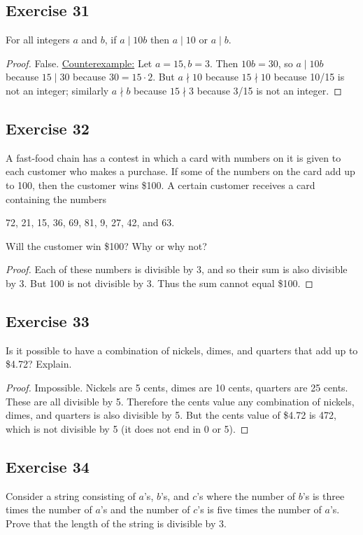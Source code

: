 \documentclass[14pt]{extarticle}
\begin{document}
\subsection{Exercise 31}
For all integers $a$ and $b$, if $a\mid 10b$ then $a\mid 10$ or $a\mid b$.

\begin{proof}
False. \underline{Counterexample:} Let $a = 15, b = 3$. Then $10b = 30$, so $a \mid 10b$ because $15 \mid 30$ because $30 = 15 \cdot 2$. But $a \nmid 10$ because $15 \nmid 10$ because 10/15 is not an integer; similarly $a \nmid b$ because $15 \nmid 3$ because 3/15 is not an integer.
\end{proof}

\subsection{Exercise 32}
A fast-food chain has a contest in which a card with numbers on it is given to each customer who makes a purchase. If some of the numbers on the card add up to 100, then the customer wins \$100. A certain customer receives a card containing the numbers 
\begin{center}
72, 21, 15, 36, 69, 81, 9, 27, 42, and 63. 
\end{center}
Will the customer win \$100? Why or why not?

\begin{proof}
Each of these numbers is divisible by 3, and so their sum is also divisible by 3. But 100 is not divisible by 3. Thus the sum cannot equal \$100.
\end{proof}

\subsection{Exercise 33}
Is it possible to have a combination of nickels, dimes, and quarters that add up to \$4.72? Explain.

\begin{proof}
Impossible. Nickels are 5 cents, dimes are 10 cents, quarters are 25 cents. These are all divisible by 5. Therefore the cents value any combination of nickels, dimes, and quarters is also divisible by 5. But the cents value of \$4.72 is 472, which is not divisible by 5 (it does not end in 0 or 5).
\end{proof}

\subsection{Exercise 34}
Consider a string consisting of $a$’s, $b$’s, and $c$’s where the number of $b$’s is three times the number of $a$’s and the number of $c$’s is five times the number of $a$’s. Prove that the length of the string is divisible by 3.
\end{document}
